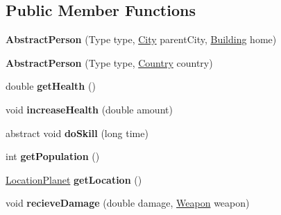 \subsection*{Public Member Functions}
\begin{DoxyCompactItemize}
\item 
{\bfseries Abstract\+Person} (Type type, \hyperlink{classcities_1_1_city}{City} parent\+City, \hyperlink{classbuildings_1_1_building}{Building} home)\hypertarget{classpeople_1_1_abstract_person_a8ad25754c82228251a2798021134538e}{}\label{classpeople_1_1_abstract_person_a8ad25754c82228251a2798021134538e}

\item 
{\bfseries Abstract\+Person} (Type type, \hyperlink{classplanets_1_1_country}{Country} country)\hypertarget{classpeople_1_1_abstract_person_a81a8445b90bdf26bd39733a71cbba535}{}\label{classpeople_1_1_abstract_person_a81a8445b90bdf26bd39733a71cbba535}

\item 
double {\bfseries get\+Health} ()\hypertarget{classpeople_1_1_abstract_person_a7bb37afb10c0ba7de9f7ee1d5bbc807d}{}\label{classpeople_1_1_abstract_person_a7bb37afb10c0ba7de9f7ee1d5bbc807d}

\item 
void {\bfseries increase\+Health} (double amount)\hypertarget{classpeople_1_1_abstract_person_a4d7033ee8cb531f328b43976a02f6c37}{}\label{classpeople_1_1_abstract_person_a4d7033ee8cb531f328b43976a02f6c37}

\item 
abstract void {\bfseries do\+Skill} (long time)\hypertarget{classpeople_1_1_abstract_person_addd73d69c646f86ce7154b775dd850f9}{}\label{classpeople_1_1_abstract_person_addd73d69c646f86ce7154b775dd850f9}

\item 
int {\bfseries get\+Population} ()\hypertarget{classpeople_1_1_abstract_person_aa9e73afa89e43b813f59096d9b34abaa}{}\label{classpeople_1_1_abstract_person_aa9e73afa89e43b813f59096d9b34abaa}

\item 
\hyperlink{classplanets_1_1_location_planet}{Location\+Planet} {\bfseries get\+Location} ()\hypertarget{classpeople_1_1_abstract_person_acda198cc503d4a6a0d7b53a6d5543350}{}\label{classpeople_1_1_abstract_person_acda198cc503d4a6a0d7b53a6d5543350}

\item 
void {\bfseries recieve\+Damage} (double damage, \hyperlink{classtools_1_1weapons_1_1_weapon}{Weapon} weapon)\hypertarget{classpeople_1_1_abstract_person_a81ed021538dafbb5f69b6d30646f0f20}{}\label{classpeople_1_1_abstract_person_a81ed021538dafbb5f69b6d30646f0f20}


\end{DoxyCompactItemize}
